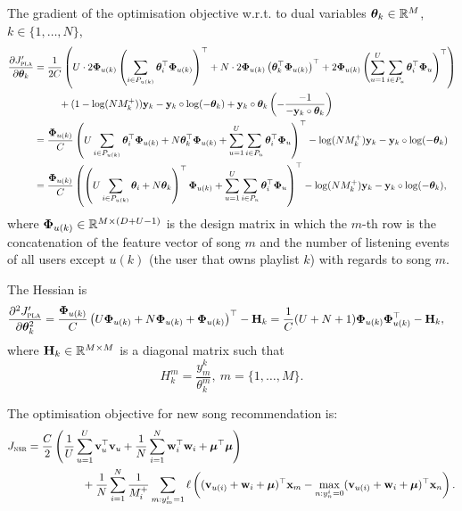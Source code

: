 The gradient of the optimisation objective w.r.t. to dual variables $\bm{\theta}_k \in \mathbb{R}^{M}$, $k \in \{1,\dots,N\}$,
\begin{equation*}
\begin{aligned}
\frac{\partial J_\textsc{pla}'}{\partial \bm{\theta}_k}
&= \frac{1}{2 C} \left( U \cdot 2 \mathbf{\Phi}_{u(k)} \left(\sum_{i \in P_{u(k)}} \bm{\theta}_i^\top \mathbf{\Phi}_{u(k)} \right)^\top 
   + N \cdot 2 \mathbf{\Phi}_{u(k)} \left( \bm{\theta}_k^\top \mathbf{\Phi}_{u(k)} \right)^\top
   + 2 \mathbf{\Phi}_{u(k)} \left(\sum_{u=1}^U \sum_{i \in P_u} \bm{\theta}_i^\top \mathbf{\Phi}_u \right)^\top \right) \\
& \hspace{2.5em}
   + (1 - \log(N M_k^+)) \mathbf{y}_k - \mathbf{y}_k \circ \log(-\bm{\theta}_k) + \mathbf{y}_k \circ \bm{\theta}_k \left( -\frac{-1}{-\mathbf{y}_k \circ \bm{\theta}_k} \right) \\
&= \frac{\mathbf{\Phi}_{u(k)}}{C} \left( U \sum_{i \in P_{u(k)}} \bm{\theta}_i^\top \mathbf{\Phi}_{u(k)}
   + N \bm{\theta}_k^\top \mathbf{\Phi}_{u(k)} 
   + \sum_{u=1}^U \sum_{i \in P_u} \bm{\theta}_i^\top \mathbf{\Phi}_u \right)^\top
   - \log(N M_k^+) \mathbf{y}_k - \mathbf{y}_k \circ \log(-\bm{\theta}_k) \\
&= \frac{\mathbf{\Phi}_{u(k)}}{C} \left( \left( U \sum_{i \in P_{u(k)}} \bm{\theta}_i + N \bm{\theta}_k \right)^\top \mathbf{\Phi}_{u(k)} 
   + \sum_{u=1}^U \sum_{i \in P_u} \bm{\theta}_i^\top \mathbf{\Phi}_u \right)^\top
   - \log(N M_k^+) \mathbf{y}_k - \mathbf{y}_k \circ \log(-\bm{\theta}_k),
\end{aligned}
\end{equation*}
where $\mathbf{\Phi}_{u(k)} \in \mathbb{R}^{M \times (D + U - 1)}$ is the design matrix in which 
the $m$-th row is the concatenation of the feature vector of song $m$ 
and the number of listening events of all users except $u(k)$ (the user that owns playlist $k$) with regards to song $m$.

The Hessian is
\begin{equation*}
\begin{aligned}
\frac{\partial^2 J_\textsc{pla}'}{\partial \bm{\theta}_k^2}
&= \frac{\mathbf{\Phi}_{u(k)}}{C} \left( U \mathbf{\Phi}_{u(k)} + N \mathbf{\Phi}_{u(k)} + \mathbf{\Phi}_{u(k)} \right)^\top - \mathbf{H}_k
 = \frac{1}{C} (U + N + 1) \mathbf{\Phi}_{u(k)} \mathbf{\Phi}_{u(k)}^\top - \mathbf{H}_k,
\end{aligned}
\end{equation*}
where $\mathbf{H}_k \in \mathbb{R}^{M \times M}$ is a diagonal matrix such that
\begin{equation*}
H_k^m = \frac{y_m^k}{\theta_k^m}, \ m = \{1,\dots,M\}.
\end{equation*}


The optimisation objective for new song recommendation is:
\begin{equation}
\label{eq:primal_nsr}
\begin{aligned}
J_\textsc{nsr}
&= \frac{C}{2} \left( \frac{1}{U} \sum_{u=1}^U \mathbf{v}_u^\top \mathbf{v}_u 
     + \frac{1}{N} \sum_{i=1}^N \mathbf{w}_i^\top \mathbf{w}_i + \bm{\mu}^\top \bm{\mu} \right) \\
& \hspace{5em}
     + \frac{1}{N} \sum_{i=1}^N \frac{1}{M_i^+} \sum_{m: y_m^i = 1} \ell \left( (\mathbf{v}_{u(i)} + \mathbf{w}_i + \bm{\mu})^\top \mathbf{x}_m 
     - \max_{n: y_n^i = 0} (\mathbf{v}_{u(i)} + \mathbf{w}_i + \bm{\mu})^\top \mathbf{x}_n \right).
\end{aligned}
\end{equation}

